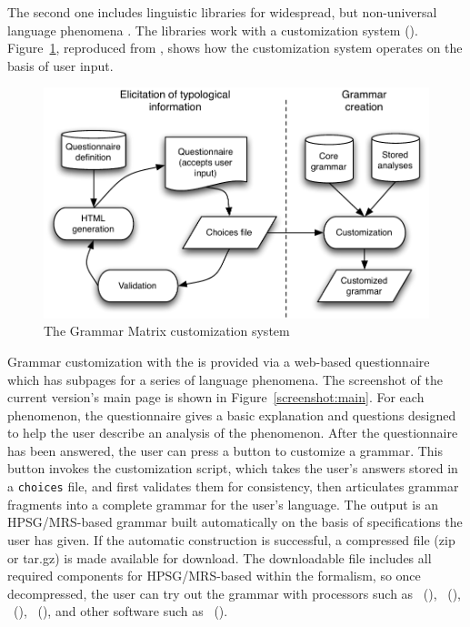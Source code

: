 

\noindent The second one includes linguistic libraries for widespread,
but non-universal language phenomena
\citep{bender:flickinger:05,drellishak:09}.  The libraries work with a
customization system
().
Figure~\ref{fig:schema}, reproduced from \citet{bender:etal:10}, shows
how the \lingo {} customization system operates on
the basis of user input.



\begin{figure} 
\begin{center} 
\includegraphics[width=.9\textwidth]{pdf/schema.pdf}
\caption{The \lingo Grammar Matrix customization system}
\label{fig:schema}
\end{center}
\end{figure}




\largerpage
Grammar customization with the \lingo {} is provided
via a web-based questionnaire which has subpages for a series of
language phenomena.  The screenshot of the current version's main page
is shown in Figure~\ref{screenshot:main}.  For each phenomenon, the
questionnaire gives a basic explanation and questions designed to help
the user describe an analysis of the phenomenon.  After the
questionnaire has been answered, the user can press a button to
customize a grammar.  This button invokes the customization script,
which takes the user's answers stored in a \texttt{choices} file, and
first validates them for consistency, then articulates grammar
fragments into a complete grammar for the user's
language. The output is an HPSG/MRS-based grammar
built automatically on the basis of specifications the user has
given. If the automatic construction is successful, a compressed file
(zip or tar.gz) is made available for download. The downloadable file
includes all required components for HPSG/MRS-based  within the  formalism, so once
decompressed, the user can try out the grammar with processors such as
\isi{\lkb}~(\citealt{copestake:02}),
\isi{\pet}~(\citealt{callmeier:00}),
\isi{\agree}~(\citealt{slayden:12}),
\isi{\ace}~(), and other
 software such as \isi{\itsdb}~(\citealt{oepen:01}).


